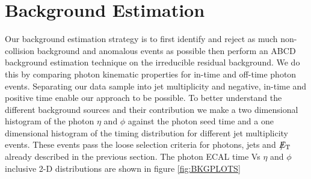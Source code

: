 \section{Background Estimation}
Our background estimation strategy is to first identify and reject as much non-collision background and anomalous events as possible then perform an ABCD background estimation technique on the irreducible residual background. We do this by comparing photon kinematic properties for in-time and off-time photon events. Separating our data sample into jet multiplicity and negative, in-time and positive time enable our approach to be possible. To better understand the different background sources and their contribution we make a two dimensional histogram of the photon $\eta$ and $\phi$ against the photon seed time  and a one dimensional histogram of the timing distribution for different jet multiplicity events. These events pass the loose selection criteria for photons, jets and $E_{\mathrm{T}}\hspace{-1.2em}/$~~ already described in the previous section.
The photon ECAL time  Vs $\eta$ and $\phi$ inclusive 2-D distributions are shown in figure \ref{fig:BKGPLOTS}
